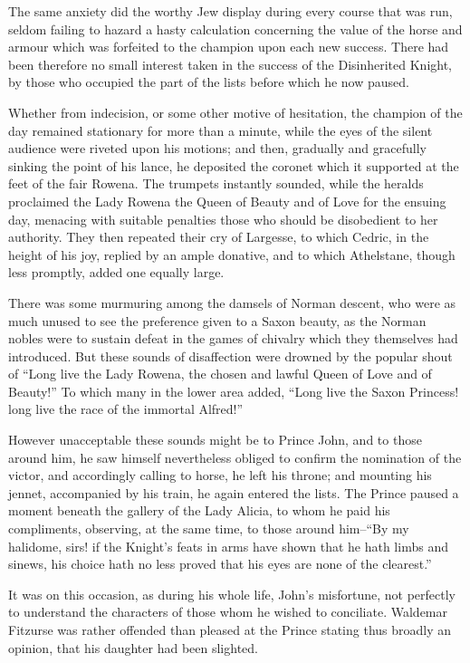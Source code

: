 The same anxiety did the worthy Jew display during every course that was
run, seldom failing to hazard a hasty calculation concerning the value
of the horse and armour which was forfeited to the champion upon each
new success. There had been therefore no small interest taken in the
success of the Disinherited Knight, by those who occupied the part of
the lists before which he now paused.

Whether from indecision, or some other motive of hesitation, the
champion of the day remained stationary for more than a minute, while
the eyes of the silent audience were riveted upon his motions; and then,
gradually and gracefully sinking the point of his lance, he deposited
the coronet which it supported at the feet of the fair Rowena. The
trumpets instantly sounded, while the heralds proclaimed the Lady Rowena
the Queen of Beauty and of Love for the ensuing day, menacing with
suitable penalties those who should be disobedient to her authority.
They then repeated their cry of Largesse, to which Cedric, in the height
of his joy, replied by an ample donative, and to which Athelstane,
though less promptly, added one equally large.

There was some murmuring among the damsels of Norman descent, who were
as much unused to see the preference given to a Saxon beauty, as the
Norman nobles were to sustain defeat in the games of chivalry which they
themselves had introduced. But these sounds of disaffection were drowned
by the popular shout of ``Long live the Lady Rowena, the chosen and
lawful Queen of Love and of Beauty!'' To which many in the lower area
added, ``Long live the Saxon Princess! long live the race of the
immortal Alfred!''

However unacceptable these sounds might be to Prince John, and to those
around him, he saw himself nevertheless obliged to confirm the
nomination of the victor, and accordingly calling to horse, he left his
throne; and mounting his jennet, accompanied by his train, he again
entered the lists. The Prince paused a moment beneath the gallery of the
Lady Alicia, to whom he paid his compliments, observing, at the same
time, to those around him--``By my halidome, sirs! if the Knight's feats
in arms have shown that he hath limbs and sinews, his choice hath no
less proved that his eyes are none of the clearest.''

It was on this occasion, as during his whole life, John's misfortune,
not perfectly to understand the characters of those whom he wished to
conciliate. Waldemar Fitzurse was rather offended than pleased at the
Prince stating thus broadly an opinion, that his daughter had been
slighted.

